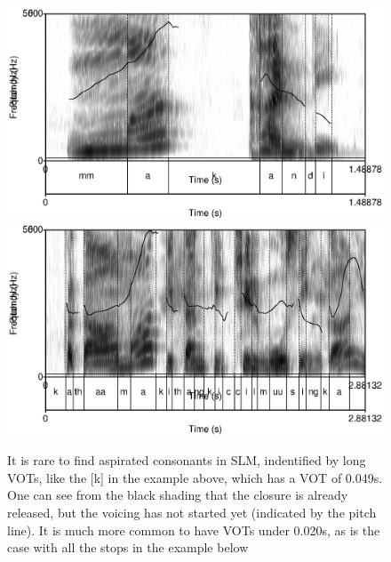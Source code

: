 \begin{figure}
 \centering
 \includegraphics[height=0.3\textheight]{./pics/mmakandi-asp.eps}
 \includegraphics[height=0.3\textheight]{./pics/kathaamakiccilmuusingka.eps}

 \caption{It is rare to find aspirated consonants in SLM, indentified by long VOTs, like the [k] in  the example above, which has a VOT of 0.049s. One can see from the black shading that the closure is already released, but the voicing has not started yet (indicated by the pitch line).
It is much more common to have VOTs under 0.020s, as is the case with all the stops in the example below}
 \label{fig:phon:vot:mmakang-asp}
\end{figure}

